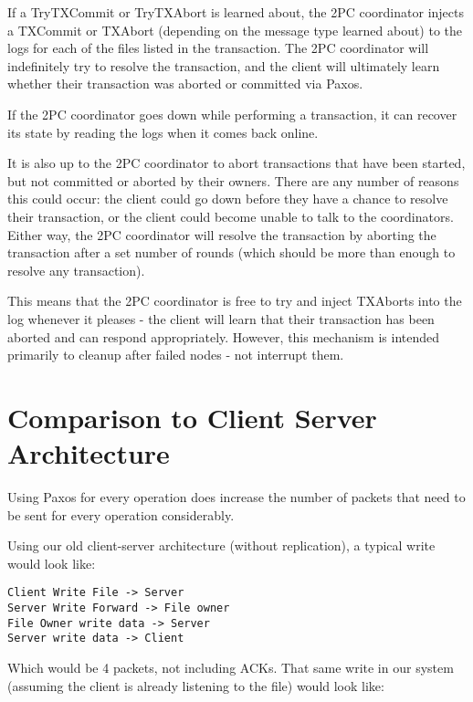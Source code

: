 \documentclass[11pt]{article}
\begin{document}
If a TryTXCommit or TryTXAbort is learned about, the 2PC coordinator injects a TXCommit or TXAbort (depending on the message type learned about) to the logs for each of the files listed in the transaction.
The 2PC coordinator will indefinitely try to resolve the transaction, and the client will ultimately learn whether their transaction was aborted or committed via Paxos. 

If the 2PC coordinator goes down while performing a transaction, it can recover its state by reading the logs when it comes back online.

It is also up to the 2PC coordinator to abort transactions that have been started, but not committed or aborted by their owners. There are any number of reasons this could occur: the client could go down before they have a chance to resolve their transaction, or the client could become unable to talk to the coordinators. Either way, the 2PC coordinator will resolve the transaction by aborting the transaction after a set number of rounds (which should be more than enough to resolve any transaction).

This means that the 2PC coordinator is free to try and inject TXAborts into the log whenever it pleases - the client will learn that their transaction has been aborted and can respond appropriately. However, this mechanism is intended primarily to cleanup after failed nodes - not interrupt them.

\section{Comparison to Client Server Architecture}




Using Paxos for every operation does increase the number of packets that need to be sent for every operation considerably.

Using our old client-server architecture (without replication), a typical write would look like:

\begin{verbatim}
Client Write File -> Server
Server Write Forward -> File owner
File Owner write data -> Server
Server write data -> Client
\end{verbatim}

Which would be 4 packets, not including ACKs.
That same write in our system (assuming the client is already listening to the file) would look like:
\end{document}
